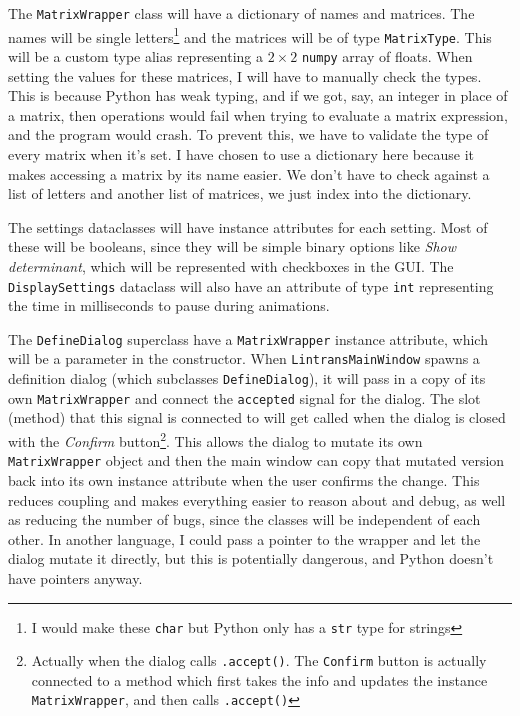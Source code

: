 \documentclass[../main.tex]{subfiles}
\begin{document}
The \texttt{MatrixWrapper} class will have a dictionary of names and matrices. The names will be single letters\footnote{I would make these \texttt{char} but Python only has a \texttt{str} type for strings} and the matrices will be of type \texttt{MatrixType}. This will be a custom type alias representing a $2 \times 2$ \texttt{numpy} array of floats. When setting the values for these matrices, I will have to manually check the types. This is because Python has weak typing, and if we got, say, an integer in place of a matrix, then operations would fail when trying to evaluate a matrix expression, and the program would crash. To prevent this, we have to validate the type of every matrix when it's set. I have chosen to use a dictionary here because it makes accessing a matrix by its name easier. We don't have to check against a list of letters and another list of matrices, we just index into the dictionary.

The settings dataclasses will have instance attributes for each setting. Most of these will be booleans, since they will be simple binary options like \textit{Show determinant}, which will be represented with checkboxes in the GUI. The \texttt{DisplaySettings} dataclass will also have an attribute of type \texttt{int} representing the time in milliseconds to pause during animations.

The \texttt{DefineDialog} superclass have a \texttt{MatrixWrapper} instance attribute, which will be a parameter in the constructor. When \texttt{LintransMainWindow} spawns a definition dialog (which subclasses \texttt{DefineDialog}), it will pass in a copy of its own \texttt{MatrixWrapper} and connect the \texttt{accepted} signal for the dialog. The slot (method) that this signal is connected to will get called when the dialog is closed with the \textit{Confirm} button\footnote{Actually when the dialog calls \texttt{.accept()}. The \texttt{Confirm} button is actually connected to a method which first takes the info and updates the instance \texttt{MatrixWrapper}, and then calls \texttt{.accept()}}. This allows the dialog to mutate its own \texttt{MatrixWrapper} object and then the main window can copy that mutated version back into its own instance attribute when the user confirms the change. This reduces coupling and makes everything easier to reason about and debug, as well as reducing the number of bugs, since the classes will be independent of each other. In another language, I could pass a pointer to the wrapper and let the dialog mutate it directly, but this is potentially dangerous, and Python doesn't have pointers anyway.
\end{document}
